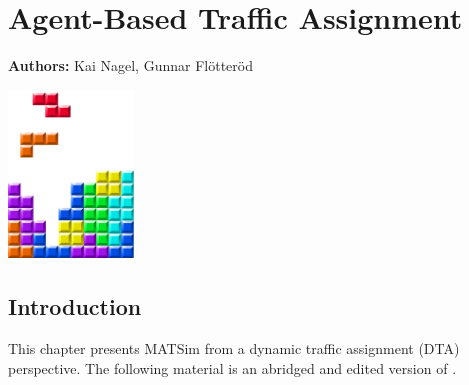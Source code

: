 \def\todoNextRevision#1{{\color{blue}[[``todo next revision'': #1]]}}

\chapter{Agent-Based Traffic Assignment }
\label{ch:abta}

\hfill \textbf{Authors:} Kai Nagel, Gunnar Flötteröd

\begin{center} \includegraphics[width=0.25\textwidth, angle=0]{figures/MATSimBook.png} \end{center}






\section{Introduction}
\label{sec:agenbased-dta-intro}

This chapter presents MATSim from a dynamic traffic assignment (DTA) perspective. 
The following material is an abridged and edited version of \citet{NagelFloetteroed2009IatbrResourceInBook}.



